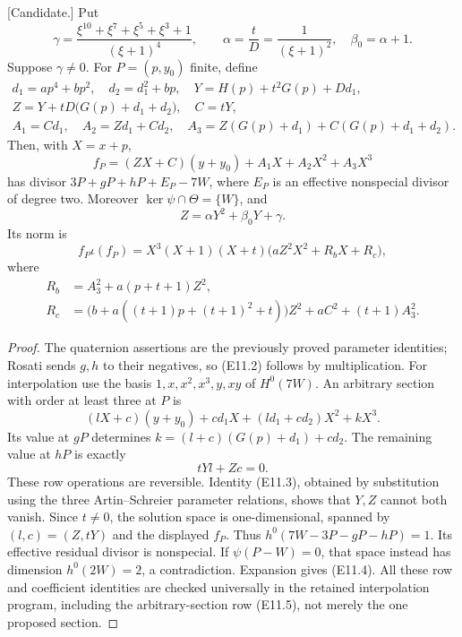 \begin{lemma}
\label{lem:uniform-eleven-interpolation-candidate}
\textup{[Candidate.]}
Put
\[
 \gamma=\frac{\xi^{10}+\xi^7+\xi^5+\xi^3+1}{(\xi+1)^4},
 \qquad \alpha=\frac{t}{D}=\frac1{(\xi+1)^2},\quad
 \beta_0=\alpha+1.
\]
Suppose $\gamma\ne0$. For $P=(p,y_0)$ finite, define
\[
\begin{gathered}
 d_1=ap^4+bp^2,\quad d_2=d_1^2+bp,\quad
 Y=H(p)+t^2G(p)+Dd_1,\\
 Z=Y+tD\bigl(G(p)+d_1+d_2\bigr),\quad C=tY,\\
 A_1=Cd_1,\quad A_2=Zd_1+Cd_2,\quad
 A_3=Z(G(p)+d_1)+C(G(p)+d_1+d_2).
\end{gathered}
\]
Then, with $X=x+p$,
\[
 f_P=(ZX+C)(y+y_0)+A_1X+A_2X^2+A_3X^3
\]
has divisor $3P+gP+hP+E_P-7W$, where $E_P$ is an effective
nonspecial divisor of degree two. Moreover
$\ker\psi\cap\Theta=\{W\}$, and
\[
 Z=\alpha Y^2+\beta_0Y+\gamma.                   \tag{E11.3}
\]
Its norm is
\[
 f_P\iota(f_P)=X^3(X+1)(X+t)
       \bigl(aZ^2X^2+R_bX+R_c\bigr),            \tag{E11.4}
\]
where
\[
\begin{split}
 R_b&=A_3^2+a(p+t+1)Z^2,\\
 R_c&=\bigl(b+a((t+1)p+(t+1)^2+t)\bigr)Z^2
            +aC^2+(t+1)A_3^2.
\end{split}
\]
\end{lemma}
\begin{proof}
The quaternion assertions are the previously proved parameter identities;
Rosati sends $g,h$ to their negatives, so (E11.2) follows by multiplication.
For interpolation use the basis $1,x,x^2,x^3,y,xy$ of $H^0(7W)$.
An arbitrary section with order at least three at $P$ is
\[
 (lX+c)(y+y_0)+cd_1X+(ld_1+cd_2)X^2+kX^3.
\]
Its value at $gP$ determines
$k=(l+c)(G(p)+d_1)+cd_2$. The remaining value at $hP$ is exactly
\[
                 tYl+Zc=0.                    \tag{E11.5}
\]
These row operations are reversible. Identity (E11.3), obtained by
substitution using the three Artin--Schreier parameter relations, shows
that $Y,Z$ cannot both vanish. Since $t\ne0$, the solution space is
one-dimensional, spanned by $(l,c)=(Z,tY)$ and the displayed $f_P$.
Thus $h^0(7W-3P-gP-hP)=1$. Its effective residual divisor is nonspecial.
If $\psi(P-W)=0$, that space instead has dimension
$h^0(2W)=2$, a contradiction. Expansion gives (E11.4).
All these row and coefficient identities are checked universally in the
retained interpolation program, including the arbitrary-section row
(E11.5), not merely the one proposed section.
\end{proof}

